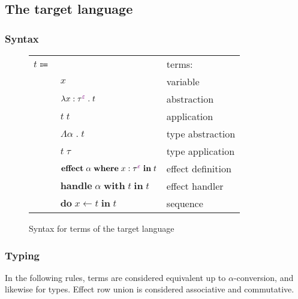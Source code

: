 \documentclass[12pt]{article}
\newcommand\anno[2]{#1 : #2}
\newcommand\term{t}
\newcommand\eVar{x}
\newcommand\eAbs[2]{\lambda #1 \; . \; #2}
\newcommand\eAbsAnno[4]{\eAbs{\anno{#1}{\tEmbellished{#2}{#3}}}{#4}}
\newcommand\eApp[2]{#1 \; #2}
\newcommand\eTAbs[2]{\Lambda #1 \; . \; #2}
\newcommand\eTApp[2]{#1 \; #2}
\newcommand\eHandle[3]{\textbf{handle} \; #1 \; \textbf{with} \; #2 \; \textbf{in} \; #3}
\newcommand\eEffect[5]{\textbf{effect} \; #1 \; \textbf{where} \; \anno{#2}{\tEmbellished{#3}{#4}} \; \textbf{in} \; #5}
\newcommand\eDo[3]{\textbf{do} \; #1 \leftarrow #2 \; \textbf{in} \; #3}
\newcommand\type{\tau}
\newcommand\tVar{\alpha}
\newcommand\tEmbellished[2]{{#1}^{\textcolor{violet}{#2}}}
\newcommand\row{\varepsilon}
\begin{document}
    \subsection{The target language}

      \subsubsection{Syntax}

        \begin{figure}[H]
          \begin{mdframed}[backgroundcolor=none]
            \begin{center}
              \begin{tabular}{l l l}
                $\term \Coloneqq$ & & terms: \\
                & $\eVar$ & variable \\
                & $\eAbsAnno{\eVar}{\type}{\row}{\term}$ & abstraction \\
                & $\eApp{\term}{\term}$ & application \\
                & $\eTAbs{\tVar}{\term}$ & type abstraction \\
                & $\eTApp{\term}{\type}$ & type application \\
                & $\eEffect{\tVar}{\eVar}{\type}{\row}{\term}$ & effect definition \\
                & $\eHandle{\tVar}{\term}{\term}$ & effect handler \\
                & $\eDo{\eVar}{\term}{\term}$ & sequence \\
              \end{tabular}
            \end{center}

            \caption{Syntax for terms of the target language}\label{fig:target_syntax}
          \end{mdframed}
        \end{figure}

      \subsubsection{Typing}
        In the following rules, terms are considered equivalent up to $\alpha$-conversion, and likewise for types. Effect row union is considered associative and commutative.
\end{document}
